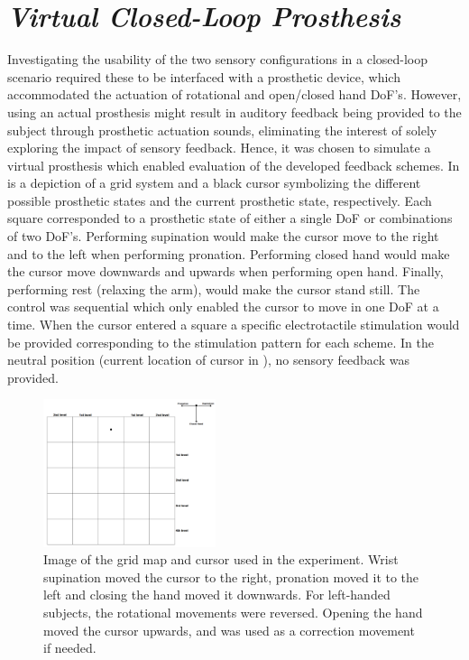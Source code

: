 

\section{\textit{Virtual Closed-Loop Prosthesis}}

Investigating the usability of the two sensory configurations in a closed-loop scenario required these to be interfaced with a prosthetic device, which accommodated the actuation of rotational and open/closed hand DoF's. However, using an actual prosthesis might result in auditory feedback being provided to the subject through prosthetic actuation sounds, eliminating the interest of solely exploring the impact of sensory feedback. Hence, it was chosen to simulate a virtual prosthesis which enabled evaluation of the developed feedback schemes. In  is a depiction of a grid system and a black cursor symbolizing the different possible prosthetic states and the current prosthetic state, respectively. Each square corresponded to a prosthetic state of either a single DoF or combinations of two DoF's. Performing supination would make the cursor move to the right and to the left when performing pronation. Performing closed hand would make the cursor move downwards and upwards when performing open hand. Finally, performing rest (relaxing the arm), would make the cursor stand still. The control was sequential which only enabled the cursor to move in one DoF at a time. When the cursor entered a square a specific electrotactile stimulation would be provided corresponding to the stimulation pattern for each scheme. In the neutral position (current location of cursor in ), no sensory feedback was provided.     

\begin{figure}[H]                 
	\includegraphics[width=0.45\textwidth]{figures/gridmap2}  
	\caption{Image of the grid map and cursor used in the experiment. Wrist supination moved the cursor to the right, pronation moved it to the left and closing the hand moved it downwards. For left-handed subjects, the rotational movements were reversed. Opening the hand moved the cursor upwards, and was used as a correction movement if needed.}
	\label{fig:pa:gridmap} 
\end{figure}